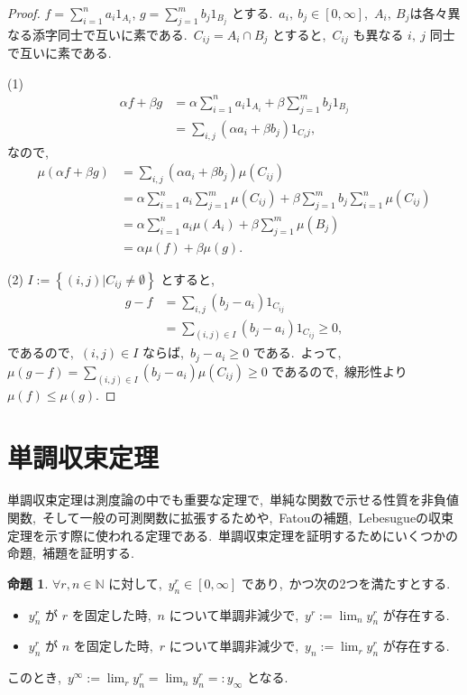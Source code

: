 \documentclass[a4j,11pt]{jarticle}
\theoremstyle{definition}
\newtheorem{proposition}[theorem]{命題}
\begin{document}
\begin{proof}
  $f = \sum_{i=1}^n a_i 1_{A_i}$, 
  $g = \sum_{j=1}^m b_j 1_{B_j}$
  とする.\ 
  $a_i,\ b_j \in \left[ 0, \infty\right]$,\ 
  $A_i,\ B_j$は各々異なる添字同士で互いに素である.\ 
  $C_{ij} = A_i \cap B_j$
  とすると,\ 
  $C_{ij}$
  も異なる
  $i,\ j$
  同士で互いに素である.\ 

  (1)
  \begin{align}
    \alpha f + \beta g
    & = \alpha \sum_{i=1}^n a_i 1_{A_i} + \beta \sum_{j=1}^m b_j 1_{B_j} \\
    & = \sum_{i,j} \left( \alpha a_i + \beta b_j \right) 1_{C_ij},
  \end{align}
  なので,\ 
  \begin{align}
    \mu(\alpha f + \beta g)
    & = \sum_{i,j} \left( \alpha a_i + \beta b_j\right) \mu(C_{ij}) \\
    & = \alpha \sum_{i=1}^n a_i \sum_{j=1}^m \mu(C_{ij}) + \beta \sum_{j=1}^m b_j \sum_{i=1}^n \mu(C_{ij}) \\
    & = \alpha \sum_{i=1}^n a_i \mu(A_i) + \beta \sum_{j=1}^m \mu(B_j) \\
    & = \alpha \mu(f) + \beta \mu(g).
  \end{align}

  (2)
  $I := \left\{(i,j) | C_{ij} \neq \emptyset \right\}$
  とすると,\ 
  \begin{align}
    g- f
    & = \sum_{i,j} (b_j - a_i) 1_{C_{ij}} \\
    & = \sum_{(i,j) \in I} (b_j - a_i) 1_{C_{ij}} \geq 0,
  \end{align}
  であるので,\ 
  $(i,j) \in I$
  ならば,\ 
  $b_j - a_i \geq 0$
  である.\ 
  よって,\ 
  $\mu(g-f) = \sum_{(i,j) \in I} (b_j-a_i) \mu(C_{ij}) \geq 0$
  であるので,\ 線形性より
  $\mu(f) \leq \mu(g)$.
\end{proof}

\section*{単調収束定理}
単調収束定理は測度論の中でも重要な定理で,\ 単純な関数で示せる性質を非負値関数,\ そして一般の可測関数に拡張するためや,\ Fatouの補題,\ Lebesugueの収束定理を示す際に使われる定理である.\ 
単調収束定理を証明するためにいくつかの命題,\ 補題を証明する.\ 

\begin{proposition}\label{prop:doubly}
  $\forall r, n \in \mathbb{N}$
  に対して,\ 
  $y_n^r \in \left[ 0,\infty \right]$
  であり,\ かつ次の2つを満たすとする.\ 
  \begin{itemize}
    \item 
      $y_n^r$
      が
      $r$
      を固定した時,\ 
      $n$
      について単調非減少で,\ 
      $y^r:=\lim_n y_n^r$
      が存在する.\ 
    \item
      $y_n^r$
      が
      $n$
      を固定した時,\ 
      $r$
      について単調非減少で,\ 
      $y_n:=\lim_r y_n^r$
      が存在する.\ 
  \end{itemize}
  このとき,\ 
  $y^\infty:=\lim_r y_n^r = \lim_n y_n^r=:y_\infty$
  となる.\ 
\end{proposition}
\end{document}
